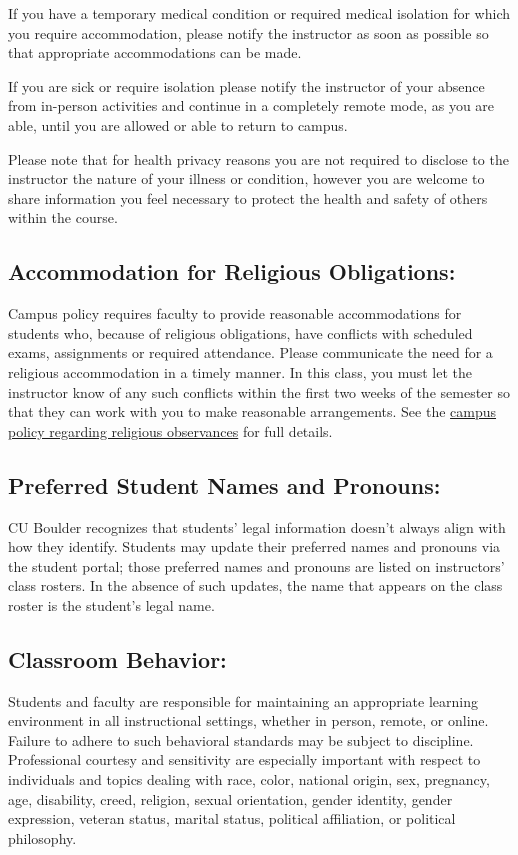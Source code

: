 If you have a temporary medical condition or required medical isolation for which you require accommodation, please notify the instructor as soon as possible so that appropriate accommodations can be made.

If you are sick or require isolation please notify the instructor of your absence from in-person activities and continue in a completely remote mode, as you are able, until you are allowed or able to return to campus.

Please note that for health privacy reasons you are not required to disclose to the instructor the nature of your illness or condition, however you are welcome to share information you feel necessary to protect the health and safety of others within the course.

\subsection*{Accommodation for Religious Obligations:}
Campus policy requires faculty to provide reasonable accommodations for students who, because of religious obligations, have conflicts with scheduled exams, assignments or required attendance. Please communicate the need for a religious accommodation in a timely manner. In this class, you must let the instructor know of any such conflicts within the first two weeks of the semester so that they can work with you to make reasonable arrangements.
See the \href{https://www.colorado.edu/compliance/policies/observance-religious-holidays-absences-classes-or-exams}{campus policy regarding religious observances} for full details.

\subsection*{Preferred Student Names and Pronouns:}
CU Boulder recognizes that students' legal information doesn't always align with how they identify. Students may update their preferred names and pronouns via the student portal; those preferred names and pronouns are listed on instructors' class rosters. In the absence of such updates, the name that appears on the class roster is the student's legal name.

\subsection*{Classroom Behavior:}
Students and faculty are responsible for maintaining an appropriate learning environment in all instructional settings, whether in person, remote, or online. Failure to adhere to such behavioral standards may be subject to discipline. Professional courtesy and sensitivity are especially important with respect to individuals and topics dealing with race, color, national origin, sex, pregnancy, age, disability, creed, religion, sexual orientation, gender identity, gender expression, veteran status, marital status, political affiliation, or political philosophy.
  
